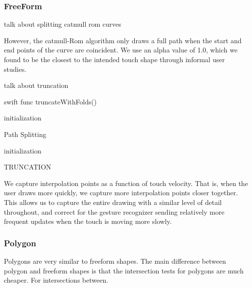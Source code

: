 \subsubsection{FreeForm}\label{freeform}

talk about splitting catmull rom curves

However, the catmull-Rom algorithm only draws a full path when the start
and end points of the curve are coincident. We use an alpha value of
1.0, which we found to be the closest to the intended touch shape
through informal user studies.

talk about truncation

\small
\singlespacing 

\begin{pygmented}{swift}
func truncateWithFolds()
\end{pygmented}

\doublespacing
\normalsize

\begin{algorithm}[H]
 initialization\;
 \caption{Path Splitting}
\end{algorithm}

\begin{algorithm}[H]
 initialization\;
 \caption{TRUNCATION}
\end{algorithm}

We capture interpolation points as a function of touch velocity. That
is, when the user draws more quickly, we capture more interpolation
points closer together. This allows us to capture the entire drawing
with a similar level of detail throughout, and correct for the gesture
recognizer sending relatively more frequent updates when the touch is
moving more slowly.

\subsubsection{Polygon}\label{polygon}

Polygons are very similar to freeform shapes. The main difference
between polygon and freeform shapes is that the intersection tests for
polygons are much cheaper. For intersections between.

